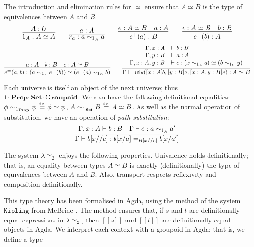 \documentclass{easychair}
\newcommand{\Prop}{\ensuremath{\mathbf{Prop}}}
\newcommand{\Set}{\ensuremath{\mathbf{Set}}}
\newcommand{\Groupoid}{\ensuremath{\mathbf{Groupoid}}}
\newcommand{\LEtwo}{\ensuremath{\lambda \! \! \simeq_2}}
\newcommand{\eqdef}{\mathrel{\smash{\stackrel{\text{def}}{=}}}}
\newcommand{\brackets}[1]{\ensuremath{[ \! [ {#1} ] \! ]}}
\begin{document}
The introduction and elimination rules for $\simeq$ ensure that $A \simeq B$ is the type of equivalences between $A$ and $B$.
\[ \infer{1_A : A \simeq A}{A : U} \qquad \infer{r_a : a \sim_{1_A} a}{a : A} \qquad \infer{e^+(a) : B}{e : A \simeq B \quad a : A} \qquad \infer{e^-(b) : A}{e : A \simeq B \quad b : B} \]
\[ \infer{e^=(a,b) : (a \sim_{1_A} e^-(b)) \simeq (e^+(a) \sim_{1_B} b)}{a : A \quad b : B \quad e : A \simeq B} \qquad
\infer{\Gamma \vdash \mathsf{univ}([x : A] b, [y : B] a, [x : A, y : B]e) : A \simeq B}{\begin{array}{rl}
\Gamma, x : A & \vdash b : B \\
\Gamma, y : B & \vdash a : A \\
\Gamma, x : A, y : B & \vdash e : (x \sim_{1_A} a) \simeq (b \sim_{1_B} y)
\end{array}} \]

Each universe is itself an object of the next universe; thus $\mathbf{1} : \Prop : \Set : \Groupoid$.  We also have the following definitional equalities:
$\phi \sim_{1_\Prop} \psi \eqdef \phi \simeq \psi$, 
$A \sim_{1_\Set} B \eqdef A \simeq B$.  As well as the normal operation of substitution, we have an operation of \emph{path substitution}:
\[ \infer{\Gamma \vdash b [x // e] : b [x/a] =_{B[x//e]} b[x/a']}{\Gamma, x : A \vdash b : B \quad \Gamma \vdash e : a \sim_{1_A} a'} \]

The system $\LEtwo$ enjoys the following properties.  Univalence holds definitionally; that is, an equality between types $A \simeq B$ is exactly (definitionally) the type of equivalences between $A$ and $B$.  Also, transport respects reflexivity and composition definitionally.

This type theory has been formalised in Agda, using the method of the system $\mathtt{Kipling}$ from McBride \cite{McBridea}.  The method ensures that, if $s$ and $t$ are definitionally equal expressions in $\lambda \simeq_2$, then $\brackets{s}$ and $\brackets{t}$ are definitionally equal objects in Agda.  We interpret each context with a groupoid in Agda; that is, we define
a type

\end{document}

